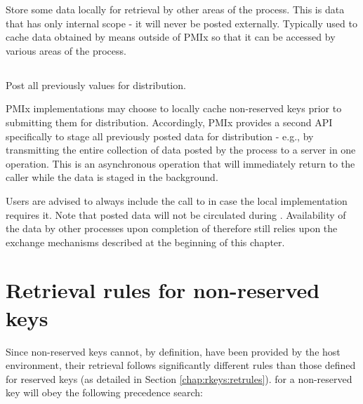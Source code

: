 \descr

Store some data locally for retrieval by other areas of the process.
This is data that has only internal scope - it will never be posted externally. Typically used to cache data obtained by means outside of \ac{PMIx} so that it can be accessed by various areas of the process.


\subsection{}

\summary

Post all previously  values for distribution.

\format


\returnsimple

\descr

\ac{PMIx} implementations may choose to locally cache non-reserved keys prior to submitting them for distribution. Accordingly, \ac{PMIx} provides a second \ac{API} specifically to stage all previously posted data for distribution - e.g., by transmitting the entire collection of data posted by the process to a server in one operation. This is an asynchronous operation that will immediately return to the caller while the data is staged in the background.

\adviceuserstart
Users are advised to always include the call to  in case the local implementation requires it. Note that posted data will not be circulated during . Availability of the data by other processes upon completion of  therefore still relies upon the exchange mechanisms described at the beginning of this chapter.
\adviceuserend


\section{Retrieval rules for non-reserved keys}
\label{chap:nrkeys:retrules}

Since non-reserved keys cannot, by definition, have been provided by the host
environment, their retrieval follows significantly different rules than those
defined for reserved keys (as detailed in Section \ref{chap:rkeys:retrules}).
 for a non-reserved key will obey the
following precedence search:

